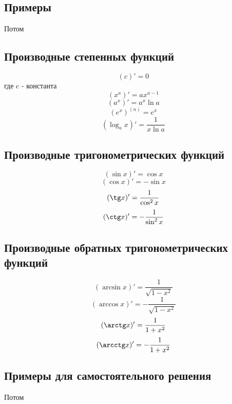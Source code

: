 \documentclass[12pt,a4paper]{article}
\begin{document}
\subsection{Примеры}

Потом

\subsection{Производные степенных функций}

$$(c)'=0$$
где c - константа
$$(x^a)'=ax^{a-1}$$
$$(a^x)'=a^x\ln a$$
$$(e^x)^{(n)}=e^x$$
$$(\log_{a} x)'=\frac{1}{x\ln a}$$

\subsection{Производные тригонометрических функций}

$$(\sin x)'=\cos x$$
$$(\cos x)'=-\sin x$$
$$(\tg x)'=\frac{1}{\cos^2 x}$$
$$(\ctg x)'=-\frac{1}{\sin^2 x}$$

\subsection{Производные обратных тригонометрических функций}

$$(\arcsin x)'=\frac{1}{\sqrt{1-x^2}}$$
$$(\arccos x)'=-\frac{1}{\sqrt{1-x^2}}$$
$$(\arctg x)'=\frac{1}{1+x^2}$$
$$(\arcctg x)'=-\frac{1}{1+x^2}$$

\subsection{Примеры для самостоятельного решения}

Потом
\end{document}
